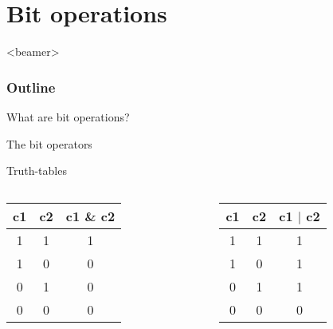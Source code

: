 \section{Bit operations}
\label{sec:overview}
\begin{frame}<beamer>
    \frametitle{Outline}
    \tableofcontents[currentsection]
\end{frame}

\begin{frame}{What are bit operations?}

\end{frame}

\begin{frame}{The bit operators}

\end{frame}

\begin{frame}{Truth-tables}

\begin{columns}
\begin{column}{0.32\linewidth}
\begin{table}
\begin{center}
\begin{tabular}{|c|c|c|}
\hline
c1 & c2 & c1 \& c2 \\ \hline \hline
1 & 1 & 1 \\ \hline
1 & 0 & 0 \\ \hline
0 & 1 & 0 \\ \hline
0 & 0 & 0 \\ \hline
\end{tabular}
\end{center}
\end{table}
\end{column}
\begin{column}{0.32\linewidth}
\begin{table}
\begin{center}
\begin{tabular}{|c|c|c|}
\hline
c1 & c2 & c1 $|$ c2 \\ \hline \hline
1 & 1 & 1 \\ \hline
1 & 0 & 1 \\ \hline
0 & 1 & 1 \\ \hline
0 & 0 & 0 \\ \hline
\end{tabular}
\end{center}
\end{table}
\end{column}


\end{columns}
\end{frame}
